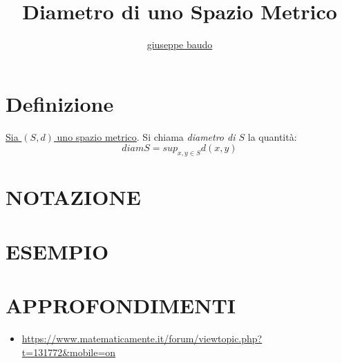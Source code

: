 \documentclass[a4paper,10pt]{article}
\title{Diametro di uno Spazio Metrico}
\author{\href{http://www.baudo.hol.es}{giuseppe baudo}}
\begin{document}
\maketitle

\section{Definizione}
\href{MetricSpace.html}{Sia $(S, d)$ uno spazio metrico}. Si chiama \textit{diametro di $S$} la quantità:
\[
 diam S = sup_{x, y \in S} d(x,y)
\]


\section{NOTAZIONE}

\section{ESEMPIO}

\section{APPROFONDIMENTI}
\begin{itemize}
 \item \url{https://www.matematicamente.it/forum/viewtopic.php?t=131772&mobile=on}
\end{itemize}
\end{document}
